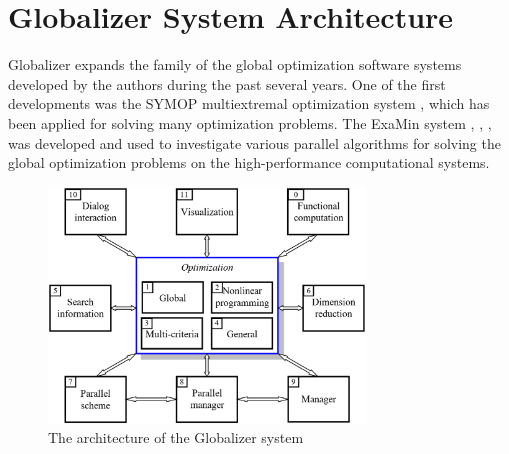 \documentclass{aims}
\theoremstyle{definition}
\begin{document}
\section{Globalizer System Architecture}
\label{sec:arch}
Globalizer expands the family of the global optimization software systems developed
by the authors during the past several years. One of the first developments was the
SYMOP multiextremal optimization system \cite{gergel1993}, which has been applied for solving
many optimization problems. The ExaMin system \cite{barkalovGergel2015}, \cite{barkalovGergelLebedev2015},
\cite{barkalovGergelLebedevSysoev2015}, \cite{gergelLebedev2015} was developed
and used to investigate various parallel algorithms for solving the global
optimization problems on the high-performance computational systems.

\begin{figure}
    \centering
    \includegraphics[width=0.75\textwidth]{pictures/globalizerScheme.eps}
    \caption{The architecture of the Globalizer system}
    \label{fig:globalizerScheme}
\end{figure}
\end{document}
